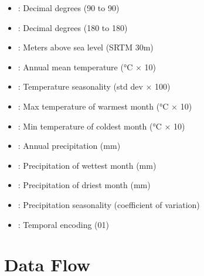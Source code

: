 \documentclass[letterpaper,10pt,english]{sphinxmanual}
\begin{document}
\sphinxAtStartPar
{}
\begin{itemize}
\item {} 
\sphinxAtStartPar
{}: Decimal degrees (\sphinxhyphen{}90 to 90)

\item {} 
\sphinxAtStartPar
{}: Decimal degrees (\sphinxhyphen{}180 to 180)

\item {} 
\sphinxAtStartPar
{}: Meters above sea level (SRTM 30m)

\item {} 
\sphinxAtStartPar
{}: Annual mean temperature (°C × 10)

\item {} 
\sphinxAtStartPar
{}: Temperature seasonality (std dev × 100)

\item {} 
\sphinxAtStartPar
{}: Max temperature of warmest month (°C × 10)

\item {} 
\sphinxAtStartPar
{}: Min temperature of coldest month (°C × 10)

\item {} 
\sphinxAtStartPar
{}: Annual precipitation (mm)

\item {} 
\sphinxAtStartPar
{}: Precipitation of wettest month (mm)

\item {} 
\sphinxAtStartPar
{}: Precipitation of driest month (mm)

\item {} 
\sphinxAtStartPar
{}: Precipitation seasonality (coefficient of variation)

\item {} 
\sphinxAtStartPar
{}: Temporal encoding (0\sphinxhyphen{}1)

\end{itemize}


\section{Data Flow}
\label{\detokenize{architecture:data-flow}}
\end{document}
